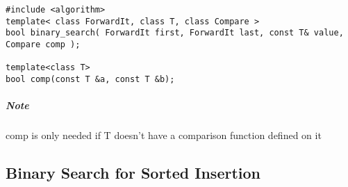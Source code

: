 \begin{lstlisting}[style=CStyle]
#include <algorithm>
template< class ForwardIt, class T, class Compare >
bool binary_search( ForwardIt first, ForwardIt last, const T& value, Compare comp );

template<class T>
bool comp(const T &a, const T &b);
\end{lstlisting}

\subparagraph{Note}
comp is only needed if T doesn't have a comparison function defined on it

\subsection{Binary Search for Sorted Insertion}

